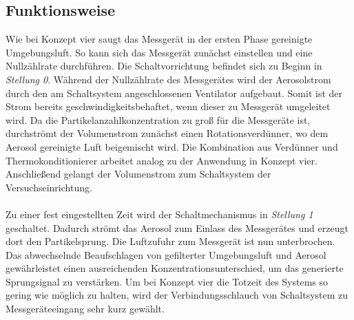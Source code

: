 \subsection{Funktionsweise}
Wie bei Konzept vier saugt das Messger\"{a}t in der ersten Phase gereinigte Umgebungsluft. So kann sich das Messger\"{a}t zun\"{a}chst einstellen und eine Nullz\"{a}hlrate durchf\"{u}hren. Die Schaltvorrichtung befindet sich zu Beginn in \textit{Stellung 0}. W\"{a}hrend der Nullz\"{a}hlrate des Messger\"{a}tes wird der Aerosolstrom durch den am Schaltsystem angeschlossenen Ventilator aufgebaut. Somit ist der Strom bereits geschwindigkeitsbehaftet, wenn dieser zu Messger\"{a}t umgeleitet wird. Da die Partikelanzahlkonzentration zu gro{\ss} f\"{u}r die Messger\"{a}te ist, durchstr\"{o}mt der Volumenstrom zun\"{a}chst einen Rotationsverd\"{u}nner, wo dem Aerosol gereinigte Luft beigemischt wird. Die Kombination aus Verd\"{u}nner und Thermokonditionierer arbeitet analog zu der Anwendung in Konzept vier. Anschlie{\ss}end gelangt der Volumenstrom zum Schaltsystem der Versuchseinrichtung.
\\\\
Zu einer fest eingestellten Zeit wird der Schaltmechanismus in \textit{Stellung 1} geschaltet. Dadurch str\"{o}mt das Aerosol zum Einlass des Messger\"{a}tes und erzeugt dort den Partikelsprung. Die Luftzufuhr zum Messger\"{a}t ist nun unterbrochen. Das abwechselnde Beaufschlagen von gefilterter Umgebungsluft und Aerosol gew\"{a}hrleistet einen ausreichenden Konzentrationsunterschied, um das generierte Sprungsignal zu verst\"{a}rken\cite{auswertemethodik}. Um bei Konzept vier die Totzeit des Systems so gering wie m\"{o}glich zu halten, wird der Verbindungsschlauch von Schaltsystem zu Messger\"{a}teeingang sehr kurz gew\"{a}hlt.